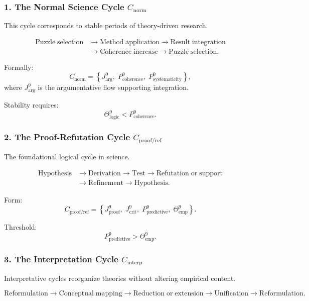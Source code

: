 \subsubsection{1. The Normal Science Cycle $C_{\mathrm{norm}}$}

This cycle corresponds to stable periods of theory-driven research.

\[
  \begin{aligned}
  \mathrm{Puzzle\;selection}
  &\to \mathrm{Method\;application}
  \to \mathrm{Result\;integration}\\
  &\to \mathrm{Coherence\;increase}
  \to \mathrm{Puzzle\;selection}.
  \end{aligned}
\]

Formally:
\[
 C_{\mathrm{norm}}
 =
 \left\{
   J^9_{\mathrm{arg}},\;
   P^9_{\mathrm{coherence}},\;
   P^9_{\mathrm{systematicity}}
 \right\},
\]
where $J^9_{\mathrm{arg}}$ is the argumentative flow supporting integration.

Stability requires:
\[
  \Theta^9_\mathrm{logic} < P^9_{\mathrm{coherence}}.
\]


\subsubsection{2. The Proof-Refutation Cycle $C_{\mathrm{proof/ref}}$}

The foundational logical cycle in science.

\[
  \begin{aligned}
  \mathrm{Hypothesis}
  &\to \mathrm{Derivation}
  \to \mathrm{Test}
  \to \mathrm{Refutation\;or\;support}\\
  &\to \mathrm{Refinement}
  \to \mathrm{Hypothesis}.
  \end{aligned}
\]

Form:
\[
 C_{\mathrm{proof/ref}}
  =
  \left\{
    J^9_{\mathrm{proof}},\;
    J^9_{\mathrm{crit}},\;
    P^9_{\mathrm{predictive}},\;
    \Theta^9_{\mathrm{emp}}
  \right\}.
\]

Threshold:
\[
  P^9_{\mathrm{predictive}} > \Theta^9_\mathrm{emp}.
\]


\subsubsection{3. The Interpretation Cycle $C_{\mathrm{interp}}$}

Interpretative cycles reorganize theories without altering empirical content.

\[
  \mathrm{Reformulation}
  \to
  \mathrm{Conceptual\;mapping}
  \to
  \mathrm{Reduction\;or\;extension}
  \to
  \mathrm{Unification}
  \to
  \mathrm{Reformulation}.
\]

